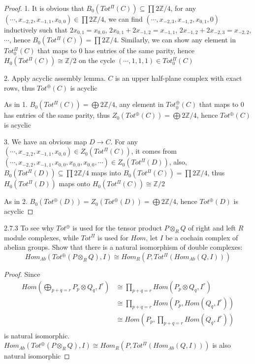 \documentclass[../main.tex]{subfiles}
\begin{document}
\begin{proof}
1. It is obvious that $B_0(Tot^\Pi(C))\subseteq\prod2\mathbb Z/4$, for any $(\cdots,x_{-2,2},x_{-1,1},x_{0,0})\in\prod2\mathbb Z/4$, we can find $(\cdots,x_{-2,3},x_{-1,2},x_{0,1},0)$ inductively such that $2x_{0,1}=x_{0,0}$, $2x_{0,1}+2x_{-1,2}=x_{-1,1}$, $2x_{-1,2}+2x_{-2,3}=x_{-2,2}$, $\cdots$, hence $B_0(Tot^\Pi(C))=\prod2\mathbb Z/4$. Similarly, we can show any element in $Tot^\Pi_0(C)$ that maps to $0$ has entries of the same parity, hence $H_0(Tot^\Pi(C))\cong\mathbb Z/2$ on the cycle $(\cdots,1,1,1)\in Tot^\Pi_0(C)$ \par
2. Apply acyclic assembly lemma. $C$ is an upper half-plane complex with exact rows, thus $Tot^\oplus(C)$ is acyclic \par
As in 1. $B_0(Tot^\Pi(C))=\bigoplus 2\mathbb Z/4$, any element in $Tot^\oplus_0(C)$ that maps to $0$ has entries of the same parity, thus $Z_0(Tot^\oplus(C))=\bigoplus 2\mathbb Z/4$, hence $Tot^\oplus(C)$ is acyclic \par
3. We have an obvious map $D\to C$. For any $(\cdots,x_{-2,2},x_{-1,1},x_{0,0})\in Z_0(Tot^\Pi(C))$, it comes from $(\cdots,x_{-2,2},x_{-1,1},x_{0,0},x_{0,0},x_{0,0},\cdots)\in Z_0(Tot^\Pi(D))$, also, $B_0(Tot^\Pi(D))\subseteq\prod2\mathbb Z/4$ maps into $B_0(Tot^\Pi(C))=\prod2\mathbb Z/4$, thus  $H_0(Tot^\Pi(D))$ maps onto $H_0(Tot^\Pi(C))\cong\mathbb Z/2$ \par
As in 2. $B_0(Tot^\oplus(D))=Z_0(Tot^\oplus(D))=\bigoplus 2\mathbb Z/4$, hence $Tot^\oplus(D)$ is acyclic 
\end{proof}

\begin{customexercise}{2.7.3}
To see why $Tot^\oplus$ is used for the tensor product $P\otimes_R Q$ of right and left $R$ module complexes, while $Tot^\Pi$ is used for $Hom$, let $I$ be a cochain complex of abelian groups. Show that there is a natural isomorphism of double complexes:
\[Hom_{Ab}(Tot^\oplus(P\otimes_RQ),I)\cong Hom_R(P,Tot^\Pi(Hom_{Ab}(Q,I)))\]
\end{customexercise}

\begin{proof}
Since
\begin{align*}
Hom\left(\bigoplus_{p+q=r} P_p\otimes Q_q,I^r\right)&\cong \prod_{p+q=r} Hom\left(P_p\otimes Q_q,I^r\right) \\
&\cong \prod_{p+q=r} Hom\left(P_p,Hom(Q_q,I^r)\right) \\
&\cong Hom\left(P_p,\prod_{p+q=r}Hom(Q_q,I^r)\right) \\
\end{align*}
is natural isomorphic. $Hom_{Ab}(Tot^\oplus(P\otimes_RQ),I)\cong Hom_R(P,Tot^\Pi(Hom_{Ab}(Q,I)))$ is also natural isomorphic
\end{proof}
\end{document}
